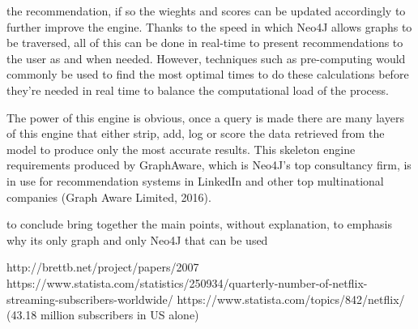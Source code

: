 \documentclass[a4paper]{article}
\begin{document}
the recommendation, if so the wieghts and scores can be updated accordingly to further improve the engine. Thanks to the speed in which Neo4J allows graphs to be traversed, all of this can be done in real-time to present recommendations to the user as and when needed. However, techniques such as pre-computing would commonly be used to find the most optimal times to do these calculations before they're needed in real time to balance the computational load of the process.

The power of this engine is obvious, once a query is made there are many layers of this engine that either strip, add, log or score the data retrieved from the model to produce only the most accurate results. This skeleton engine requirements produced by GraphAware, which is Neo4J's top consultancy firm, is in use for recommendation systems in LinkedIn and other top multinational companies (Graph Aware Limited, 2016).


to conclude bring together the main points, without explanation, to emphasis why its only graph and only Neo4J that can be used


http://brettb.net/project/papers/2007%
https://www.statista.com/statistics/250934/quarterly-number-of-netflix-streaming-subscribers-worldwide/
https://www.statista.com/topics/842/netflix/ (43.18 million subscribers in US alone)
\end{document}
